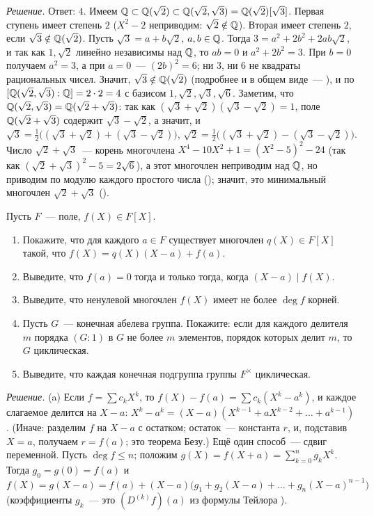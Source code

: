 \noindent\emph{Решение.} Ответ: $4$. Имеем $\mathbb Q\subset\mathbb Q(\sqrt2)\subset\mathbb Q(\sqrt2,\sqrt3)=\mathbb Q(\sqrt2)[\sqrt3]$. Первая ступень имеет
степень $2$ ($X^2-2$ неприводим: $\sqrt2\notin\mathbb Q$). Вторая имеет степень $2$, если $\sqrt3\notin\mathbb Q(\sqrt2)$. Пусть
$\sqrt3=a+b\sqrt2$, $a,b\in\mathbb Q$. Тогда $3=a^2+2b^2+2ab\sqrt2$, и так как $1,\sqrt2$ линейно независимы над $\mathbb Q$, то
$ab=0$ и $a^2+2b^2=3$. При $b=0$ получаем $a^2=3$, а при $a=0$~--- $(2b)^2=6$; ни $3$, ни $6$ не квадраты рациональных
чисел. Значит, $\sqrt3\notin\mathbb Q(\sqrt2)$ (подробнее и в общем виде~--- ), и по 
$[\mathbb Q(\sqrt2,\sqrt3):\mathbb Q]=2\cdot2=4$ с базисом $1,\sqrt2,\sqrt3,\sqrt6$. Заметим, что $\mathbb Q(\sqrt2,\sqrt3)=\mathbb Q(\sqrt2+\sqrt3)$:
так как $(\sqrt3+\sqrt2)(\sqrt3-\sqrt2)=1$, поле $\mathbb Q(\sqrt2+\sqrt3)$ содержит $\sqrt3-\sqrt2$, а значит, и
$\sqrt3=\frac12\bigl((\sqrt3+\sqrt2)+(\sqrt3-\sqrt2)\bigr)$, $\sqrt2=\frac12\bigl((\sqrt3+\sqrt2)-(\sqrt3-\sqrt2)\bigr)$. Число
$\sqrt2+\sqrt3$~--- корень многочлена $X^4-10X^2+1=(X^2-5)^2-24$ (так как $(\sqrt2+\sqrt3)^2-5=2\sqrt6$), а этот
многочлен неприводим над $\mathbb Q$, но приводим по модулю каждого простого числа (); значит, это минимальный
многочлен $\sqrt2+\sqrt3$ ().

\begin{exercise}[1-3]
Пусть $F$~--- поле, $f(X)\in F[X]$.
\begin{enumerate}[label=(\alph*)]
\item Покажите, что для каждого $a\in F$ существует многочлен $q(X)\in F[X]$ такой, что $f(X)=q(X)(X-a)+f(a)$.
\item Выведите, что $f(a)=0$ тогда и только тогда, когда $(X-a)\mid f(X)$.
\item Выведите, что ненулевой многочлен $f(X)$ имеет не более $\deg f$ корней.
\item Пусть $G$~--- конечная абелева группа. Покажите: если для каждого делителя $m$ порядка $(G:1)$ в $G$ не более $m$
элементов, порядок которых делит $m$, то $G$ циклическая.
\item Выведите, что каждая конечная подгруппа группы $F^\times$ циклическая.
\end{enumerate}
\end{exercise}

\noindent\emph{Решение.} (a) Если $f=\sum c_kX^k$, то $f(X)-f(a)=\sum c_k(X^k-a^k)$, и каждое слагаемое делится на $X-a$:
$X^k-a^k=(X-a)(X^{k-1}+aX^{k-2}+\dots+a^{k-1})$. (Иначе: разделим $f$ на $X-a$ с остатком; остаток~--- константа $r$, и,
подставив $X=a$, получаем $r=f(a)$; это теорема Безу.) Ещё один способ~--- сдвиг переменной. Пусть $\deg f\le n$;
положим $g(X)=f(X+a)=\sum_{k=0}^ng_kX^k$. Тогда $g_0=g(0)=f(a)$ и
\[
f(X)=g(X-a)=f(a)+(X-a)\bigl(g_1+g_2(X-a)+\dots+g_n(X-a)^{n-1}\bigr)
\]
(коэффициенты $g_k$~--- это $(D^{(k)}f)(a)$ из формулы Тейлора ).

